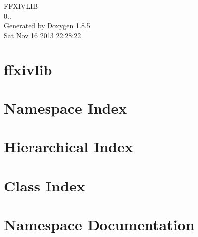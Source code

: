 \documentclass[twoside]{book}
\newcommand{\clearemptydoublepage}{%
  \newpage{\pagestyle{empty}\cleardoublepage}%
}
\begin{document}
\hypersetup{pageanchor=false}
\begin{titlepage}
\vspace*{7cm}
\begin{center}%
{\Large F\-F\-X\-I\-V\-L\-I\-B \\[1ex]\large 0.. }\\
\vspace*{1cm}
{\large Generated by Doxygen 1.8.5}\\
\vspace*{0.5cm}
{\small Sat Nov 16 2013 22:28:22}\\
\end{center}
\end{titlepage}
\clearemptydoublepage
\tableofcontents
\clearemptydoublepage
{}
\hypersetup{pageanchor=true}

\chapter{ffxivlib}
\label{md__r_e_a_d_m_e}
\hypertarget{md__r_e_a_d_m_e}{}

\chapter{Namespace Index}

\chapter{Hierarchical Index}

\chapter{Class Index}

\chapter{Namespace Documentation}












\end{document}
